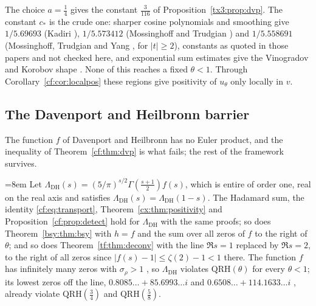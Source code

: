 The choice $a=\frac14$ gives the constant $\frac3{116}$ of Proposition~\ref{tx3:prop:dvp}. The constant $c_\ast$ is the crude one: sharper cosine polynomials and smoothing give $1/5.69693$ (Kadiri \cite{Kadiri05}), $1/5.573412$ (Mossinghoff and Trudgian \cite{MT15}) and $1/5.558691$ (Mossinghoff, Trudgian and Yang \cite{MTY}, for $\lvert t\rvert\ge2$), constants as quoted in those papers and not checked here, and exponential sum estimates give the Vinogradov and Korobov shape \cite{Vinogradov58}. None of this reaches a fixed $\theta<1$. Through Corollary~\ref{cf:cor:localpos} these regions give positivity of $u_\theta$ only locally in $v$.

\subsection{The Davenport and Heilbronn barrier}

The function $f$ of Davenport and Heilbronn has no Euler product, and the inequality of Theorem~\ref{cf:thm:dvp} is what fails; the rest of the framework survives.

\begin{proposition}\label{cf:prop:barrier}
{\emergencystretch=8em Let $\Lambda_{\mathrm{DH}}(s)=(5/\pi)^{s/2}\Gamma(\frac{s+1}2)f(s)$, which is entire of order one, real on the real axis and satisfies $\Lambda_{\mathrm{DH}}(s)=\Lambda_{\mathrm{DH}}(1-s)$. The Hadamard sum, the identity \eqref{cf:eq:transport}, Theorem~\ref{cx:thm:positivity} and Proposition~\ref{cf:prop:detect} hold for $\Lambda_{\mathrm{DH}}$ with the same proofs; so does Theorem~\ref{bsy:thm:bsy} with $h=f$ and the sum over all zeros of $f$ to the right of $\theta$; and so does Theorem~\ref{tf:thm:deconv} with the line $\Re s=1$ replaced by $\Re s=2$, to the right of all zeros since $\lvert f(s)-1\rvert\le\zeta(2)-1<1$ there. The function $f$ has infinitely many zeros with $\sigma_\rho>1$ \cite{DH36}, so $\Lambda_{\mathrm{DH}}$ violates $\mathrm{QRH}(\theta)$ for every $\theta<1$; its lowest zeros off the line, $0.8085\ldots+85.6993\ldots i$ and $0.6508\ldots+114.1633\ldots i$ \cite{Spira94}, already violate $\mathrm{QRH}(\frac34)$ and $\mathrm{QRH}(\frac58)$.\par}
\end{proposition}

